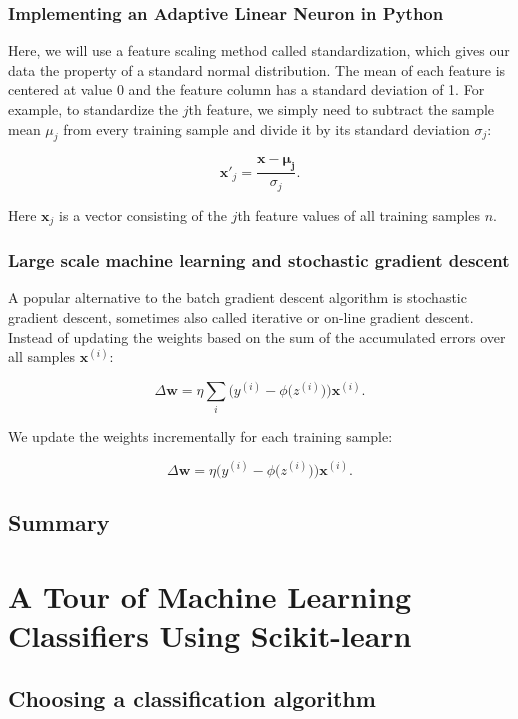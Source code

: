 \documentclass[letterpaper]{report}
\begin{document}
\subsection{Implementing an Adaptive Linear Neuron in Python}

Here, we will use a feature scaling method called standardization, which gives our data the property of a standard normal distribution. The mean of each feature
is centered at value 0 and the feature column has a standard deviation of 1. For example, to standardize the $j$th feature, we simply need to subtract the sample mean $\mu_j$ from every training sample and divide it by its standard deviation $\sigma_j$:

\[
\mathbf{x'}_j = \frac{\mathbf{x} - \mathbf{\mathbf{\mu_j}}}{\sigma_j}.
\]


Here $\mathbf{x}_j$ is a vector consisting of the $j$th feature values of all training samples $n$.

\subsection{Large scale machine learning and stochastic gradient descent}

A popular alternative to the batch gradient descent algorithm is stochastic gradient descent, sometimes also called iterative or on-line gradient descent. Instead of updating the weights based on the sum of the accumulated errors over all samples $\mathbf{x}^{(i)}$:

\[
\Delta \mathbf{w} = \eta \sum_i \bigg( y^{(i)} - \phi \big( z^{(i)}\big) \bigg) \mathbf{x}^{(i)}.
\]

We update the weights incrementally for each training sample:

\[
\Delta \mathbf{w} = \eta  \bigg( y^{(i)} - \phi \big( z^{(i)}\big) \bigg) \mathbf{x}^{(i)}.
\]

\section{Summary}



\chapter{A Tour of Machine Learning Classifiers Using Scikit-learn}

\section{Choosing a classification algorithm}
\end{document}
